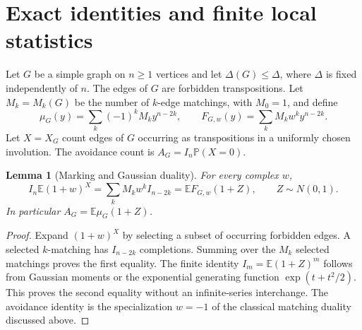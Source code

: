 \documentclass[11pt,letterpaper]{article}
\newtheorem{lemma}[theorem]{Lemma}
\theoremstyle{remark}\newtheorem{remark}[theorem]{Remark}
\newcommand{\E}{\mathbb E}\newcommand{\Prb}{\mathbb P}\newcommand{\R}{\mathbb R}\newcommand{\C}{\mathbb C}
\begin{document}
\section{Exact identities and finite local statistics}\label{fdi:sec:exact}
Let $G$ be a simple graph on $n\ge1$ vertices and let $\Delta(G)\le\Delta$, where $\Delta$ is fixed independently of $n$. The edges of $G$ are forbidden transpositions. Let $M_k=M_k(G)$ be the number of $k$-edge matchings, with $M_0=1$, and define
\[
 \mu_G(y)=\sum_k(-1)^k M_k y^{n-2k},\qquad
 F_{G,w}(y)=\sum_k M_k w^k y^{n-2k}.
\]
Let $X=X_G$ count edges of $G$ occurring as transpositions in a uniformly chosen involution. The avoidance count is $A_G=I_n\Prb(X=0)$.

\begin{lemma}[Marking and Gaussian duality]\label{fdi:lem:marking}
For every complex $w$,
\begin{equation}\label{fdi:eq:marking}
 I_n\E(1+w)^X=\sum_k M_k w^k I_{n-2k}
 =\E F_{G,w}(1+Z),\qquad Z\sim N(0,1).
\end{equation}
In particular $A_G=\E\mu_G(1+Z)$.
\end{lemma}
\begin{proof}
Expand $(1+w)^X$ by selecting a subset of occurring forbidden edges. A selected $k$-matching has $I_{n-2k}$ completions. Summing over the $M_k$ selected matchings proves the first equality. The finite identity $I_m=\E(1+Z)^m$ follows from Gaussian moments or the exponential generating function $\exp(t+t^2/2)$. This proves the second equality without an infinite-series interchange. The avoidance identity is the specialization $w=-1$ of the classical matching duality discussed above.
\end{proof}
\end{document}
